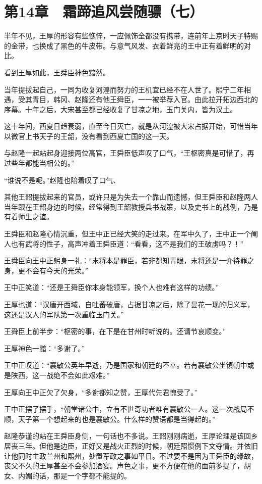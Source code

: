 \section{第14章　霜蹄追风尝随骠（七）}

半年不见，王厚的形容有些憔悴，一应佩饰全都没有携带，连前年上京时天子特赐的金带，也换成了黑色的牛皮带。与意气风发、衣着鲜亮的王中正有着鲜明的对比。

看到王厚如此，王舜臣神色黯然。

当年提拔起自己，一同为收复河湟而努力的王机宜已经不在人世了。熙宁二年相遇，受其青目，韩冈、赵隆还有他王舜臣，一一被举荐入官。由此拉开拓边西北的序幕。十年之后，大宋甚至都已经收复了甘凉之地，玉门关内，皆为汉土。

这十年间，西夏日趋衰弱，直至今日灭亡，就是从河湟被大宋占据开始，可惜当年以微官上书天子的王韶，没有看到西夏亡国的这一天。

与赵隆一起站起身迎接两位高官，王舜臣低声叹了口气，“王枢密真是可惜了，再过些年都能当相公的。”

“谁说不是呢。”赵隆也陪着叹了口气、

其他王韶提拔起来的官员，或许只是为失去一个靠山而遗憾，但王舜臣和赵隆两人当年跟在王韶身边的时候，经常得到王韶教授兵书战策，以及史书上的战例，乃是有着师生之谊。

王舜臣和赵隆心情沉重，但王中正已经大笑的走过来。在军中久了，王中正一个阉人也有武将的性子，高声冲着王舜臣道：“看看，这不是我们的王破虏吗？！”

王舜臣向王中正躬身一礼：“末将本是罪臣，若非都知青眼，末将还是一介待罪之身，更不会有今天的光荣。”

王中正笑道：“还是王舜臣你本身能领军，换个人也难有这样的功绩。”

王厚也道：“汉唐开西域，自吐蕃破唐，占据甘凉之后，除了昙花一现的归义军，这还是汉人的军队第一次重临玉门关。”

王舜臣上前半步：“枢密的事，在下是在甘州时听说的。还请节哀顺变。”

王厚神色一黯：“多谢了。”

王中正叹道：“襄敏公英年早逝，乃是国家和朝廷的不幸。若有襄敏公坐镇朝中或是陕西，这一战绝不会如此艰难。”

王厚向王中正欠了欠身，“多谢都知之赞，王厚代先君愧受了。”

王中正摆了摆手，“朝堂诸公中，立有不世奇功者唯有襄敏公一人。这一次战局不顺，天子第一个想起来的也是襄敏公。什么样的赞语都是当得起的。”

赵隆恭谨的站在王舜臣身侧，一句话也不多说。王韶刚刚病逝，王厚论理是该回乡居丧三年。但他是边臣，正好又是战火正烈的时候，朝廷照惯例下文夺情。并依旧让他同时主政兰州和熙州，处置军政之事如平日。不过要不是因为王舜臣的缘故，丧父不久的王厚甚至不会参加酒宴。声色之事，更不方便在他的面前多提了，胡女、内媚的话，那是一个字都不能提的。

